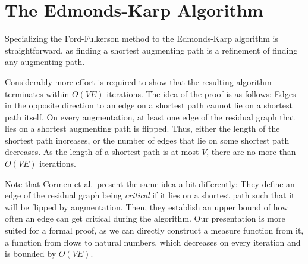 \documentclass{llncs}
\begin{document}
% 
% 
% 
% 
% 
% 
% 
% 




\section{The Edmonds-Karp Algorithm}\label{sec:edka}
  Specializing the Ford-Fulkerson method to the Edmonds-Karp algorithm is straightforward, as finding a shortest augmenting path is a refinement of finding any augmenting path.
  
  Considerably more effort is required to show that the resulting algorithm terminates within $O(VE)$ iterations. 
  The idea of the proof is as follows: Edges in the opposite direction to an edge on a shortest path cannot lie 
  on a shortest path itself.
  On every augmentation, at least one edge of the residual graph that lies on a shortest augmenting path is flipped. Thus, either the length of the shortest path increases,
  or the number of edges that lie on some shortest path decreases. As the length of a shortest path is at most $V$, there are no more than $O(VE)$ iterations.
  
  Note that Cormen et al.~present the same idea a bit differently: They define an edge of the residual graph being \emph{critical} if it lies on a shortest path such that it will be flipped by augmentation. Then, they establish an upper bound of how often an edge can get critical during the algorithm. Our presentation is more suited for a formal proof, as we can directly construct a measure function from it, \ie a function from flows to natural numbers, which decreases on every iteration and is bounded by $O(VE)$. 
  
\end{document}
